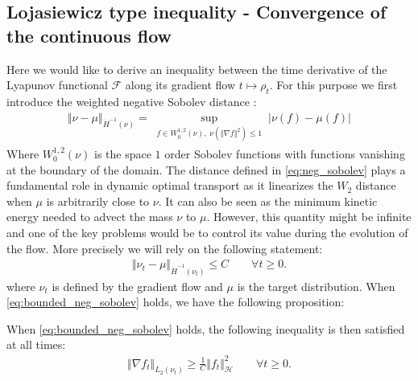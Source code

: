 
\subsection{Lojasiewicz type inequality - Convergence of the continuous flow}\label{sec:Lojasiewicz_inequality}

Here we would like to derive an inequality between the time derivative of the Lyapunov functional $\mathcal{F}$ along its gradient flow $t\mapsto \rho_t$. For this purpose we first introduce the weighted negative Sobolev distance :
\begin{align}\label{eq:neg_sobolev}
	\Vert \nu - \mu \Vert_{\dot{H}^{-1}(\nu)} = \sup_{\substack{ f\in W_0^{1,2}(\nu), \; \nu(\Vert \nabla f \Vert^2) \leq 1 }} \vert \nu(f)-\mu(f)\vert 
\end{align}
Where $W_0^{1,2}(\nu)$ is the space $1$ order Sobolev functions with functions vanishing at the boundary of the domain.
The distance defined in \cref{eq:neg_sobolev} plays a fundamental role in dynamic optimal transport as it linearizes the $W_2$ distance when $\mu$ is arbitrarily close to $\nu$. It can also be seen as the minimum kinetic energy needed to advect the mass $\nu$ to $\mu$. However, this quantity might be infinite  and one of the key problems would be to control its value during the evolution of the flow. More precisely we will rely on the following statement:
\begin{align}\label{eq:bounded_neg_sobolev}
	\Vert \nu_t  - \mu \Vert_{\dot{H}^{-1}(\nu_t)} \leq C \qquad \forall t\geq 0.
\end{align} 
where $\nu_t$ is defined by the gradient flow and $\mu$ is the target distribution. When \cref{eq:bounded_neg_sobolev}  holds, we have the following proposition:
\begin{proposition}\label{prop:PL_type_inequality}
	When \cref{eq:bounded_neg_sobolev} holds, the following inequality is then satisfied at all times:
	\begin{align}\label{eq:PL_type_inequality}
		\Vert \nabla f_t \Vert_{L_2(\nu_t)} \geq \frac{1}{C} \Vert f_t \Vert^2_{\mathcal{H}} \qquad \forall t\geq 0.
	\end{align}
\end{proposition}
